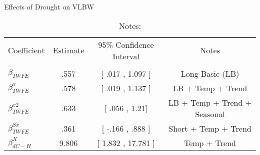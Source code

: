 \begin{table}[!ht]
\centering
\caption{Effects of Drought on VLBW}\label{tab:twfe_vlbw_test}
\renewcommand{\arraystretch}{1.5} %
\fontsize{10pt}{12pt}\selectfont
\begin{tabular}{lccc}
\toprule
 \multicolumn{1}{c}{Coefficient}  &\multicolumn{1}{c}{Estimate}&\multicolumn{1}{c}{95\% Confidence Interval}&\multicolumn{1}{c}{Notes}\\\cmidrule(lr){2-2}\cmidrule(lr){3-3}\cmidrule(lr){4-4} \\
\midrule
$\beta_{TWFE} $ & .557  &  [ .017 ,  1.097   ] & Long Basic (LB) \\
$ \beta^{x}_{TWFE} $ & .578  &  [ .019 ,  1.137   ] & LB + Temp + Trend \\
$ \beta^{x2}_{TWFE} $ & .633  &  [ .056 ,  1.21] & LB + Temp + Trend + Seasonal \\
$ \beta^{Sx}_{TWFE} $ & .361  &  [ -.166 ,  .888   ] & Short + Temp + Trend \\
$ \beta^{X}_{dC-H} $ & 9.806  &  [ 1.832 ,  17.781   ] & Temp + Trend \\
\bottomrule
\end{tabular}
\caption*{\footnotesize{Notes:}}
\end{table}
